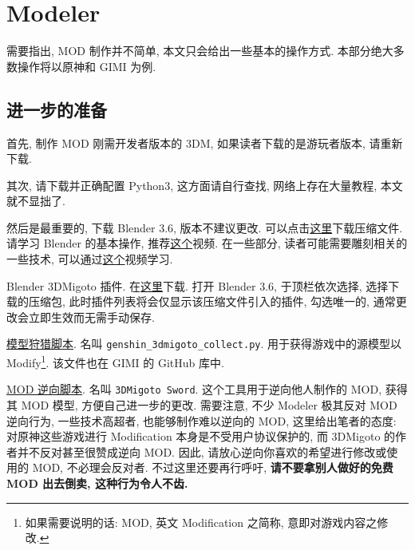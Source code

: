 \section{Modeler}
        需要指出, MOD 制作并不简单, 本文只会给出一些基本的操作方式. 本部分绝大多数操作将以原神和 GIMI 为例.

        \subsection{进一步的准备}
            \par 首先, 制作 MOD 刚需开发者版本的 3DM, 如果读者下载的是游玩者版本, 请重新下载.
            \par 其次, 请下载并正确配置 Python3, 这方面请自行查找, 网络上存在大量教程, 本文就不显拙了.
            \par 然后是最重要的, 下载 Blender 3.6, 版本不建议更改. 可以点击\href{https://download.blender.org/release/Blender3.6/blender-3.6.0-windows-x64.zip}{这里}下载压缩文件. 请学习 Blender 的基本操作, 推荐\href{https://www.bilibili.com/video/BV14u41147YH}{这个}视频. 在一些部分, 读者可能需要雕刻相关的一些技术, 可以通过\href{https://www.bilibili.com/video/BV14N4y1T7hs}{这个}视频学习.
            \par Blender 3DMigoto 插件. 在\href{https://github.com/SilentNightSound/GI-Model-Importer/releases/download/v7.0/3dmigoto-GIMI-for-playing-mods.zip}{这里}下载. 打开 Blender 3.6, 于顶栏依次选择, 选择下载的压缩包, 此时插件列表将会仅显示该压缩文件引入的插件, 勾选唯一的, 通常更改会立即生效而无需手动保存.
            \par \href{https://github.com/SilentNightSound/GI-Model-Importer/releases/download/v7.0/genshin_3dmigoto_collect.py}{模型狩猎脚本}. 名叫 \texttt{genshin\_3dmigoto\_collect.py}. 用于获得游戏中的源模型以 Modify\footnote{如果需要说明的话: MOD, 英文 Modification 之简称, 意即对游戏内容之修改.}. 该文件也在 GIMI 的 GitHub 库中.
            \par \href{https://github.com/StarBobis/3Dmigoto-Sword-Lv3/releases/download/V3.0.0.3/3Dmigoto-SwordV3.0.0.3.zip}{MOD 逆向脚本}. 名叫 \texttt{3DMigoto Sword}. 这个工具用于逆向他人制作的 MOD, 获得其 MOD 模型, 方便自己进一步的更改. 需要注意, 不少 Modeler 极其反对 MOD 逆向行为, 一些技术高超者, 也能够制作难以逆向的 MOD, 这里给出笔者的态度: 对原神这些游戏进行 Modification 本身是不受用户协议保护的, 而 3DMigoto 的作者并不反对甚至很赞成逆向 MOD. 因此, 请放心逆向你喜欢的希望进行修改或使用的 MOD, 不必理会反对者. 不过这里还要再行呼吁, \textbf{请不要拿别人做好的免费 MOD 出去倒卖, 这种行为令人不齿.}
